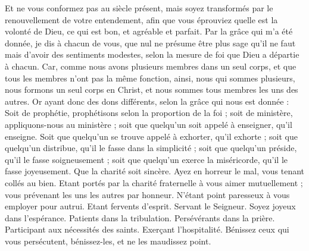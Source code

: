 \begin{multicols}{2}
Et ne vous conformez pas au siècle présent, mais soyez transformés par le renouvellement de votre entendement, afin que vous éprouviez quelle est la volonté de Dieu, ce qui est bon, et agréable et parfait.
Par la grâce qui m'a été donnée, je dis à chacun de vous, que nul ne présume être plus sage qu'il ne faut mais d'avoir des sentiments modestes, selon la mesure de foi que Dieu a départie à chacun.
Car, comme nous avons plusieurs membres dans un seul corps, et que tous les membres n'ont pas la même fonction,
ainsi, nous qui sommes plusieurs, nous formons un seul corps en Christ, et nous sommes tous membres les uns des autres.
Or ayant donc des dons différents, selon la grâce qui nous est donnée : Soit de prophétie, prophétisons selon la proportion de la foi ;
soit de ministère, appliquons-nous au ministère ; soit que quelqu'un soit appelé à enseigner, qu'il enseigne.
Soit que quelqu'un se trouve appelé à exhorter, qu'il exhorte ; soit que quelqu'un distribue, qu'il le fasse dans la simplicité ; soit que quelqu'un préside, qu'il le fasse soigneusement ; soit que quelqu'un exerce la miséricorde, qu'il le fasse joyeusement.
Que la charité soit sincère. Ayez en horreur le mal, vous tenant collés au bien.
Etant portés par la charité fraternelle à vous aimer mutuellement ; vous prévenant les uns les autres par honneur.
N'étant point paresseux à vous employer pour autrui. Etant fervents d'esprit. Servant le Seigneur.
Soyez joyeux dans l'espérance. Patients dans la tribulation. Persévérants dans la prière.
Participant aux nécessités des saints. Exerçant l'hospitalité.
Bénissez ceux qui vous persécutent, bénissez-les, et ne les maudissez point.

\end{multicols}
